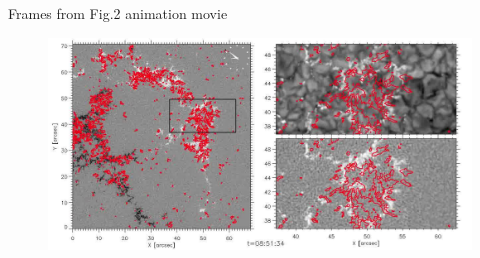 \documentclass{beamer}
\begin{document}
\begin{frame}{Frames from Fig.2 animation movie}
\begin{figure}[H]
 \centering
 \includegraphics[scale=0.28]{output009.jpg}
\end{figure}

\end{frame}
\end{document}
